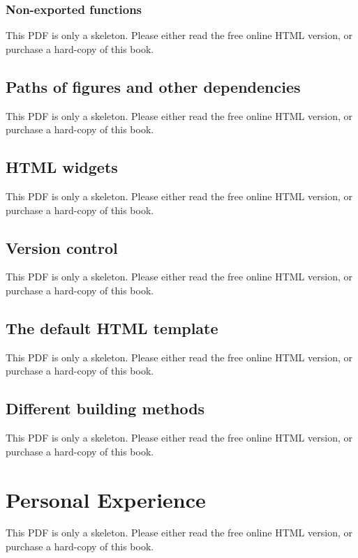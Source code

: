 \documentclass[
  12pt,
]{krantz}
\begin{document}
\subsection{Non-exported functions}\label{non-exported-functions}

This PDF is only a skeleton. Please either read the free online HTML version, or purchase a hard-copy of this book.

\section{Paths of figures and other dependencies}\label{dep-path}

This PDF is only a skeleton. Please either read the free online HTML version, or purchase a hard-copy of this book.

\section{HTML widgets}\label{html-widgets}

This PDF is only a skeleton. Please either read the free online HTML version, or purchase a hard-copy of this book.

\section{Version control}\label{version-control}

This PDF is only a skeleton. Please either read the free online HTML version, or purchase a hard-copy of this book.

\section{The default HTML template}\label{default-template}

This PDF is only a skeleton. Please either read the free online HTML version, or purchase a hard-copy of this book.

\section{Different building methods}\label{methods}

This PDF is only a skeleton. Please either read the free online HTML version, or purchase a hard-copy of this book.

\chapter{Personal Experience}\label{personal-experience}

This PDF is only a skeleton. Please either read the free online HTML version, or purchase a hard-copy of this book.
\end{document}
